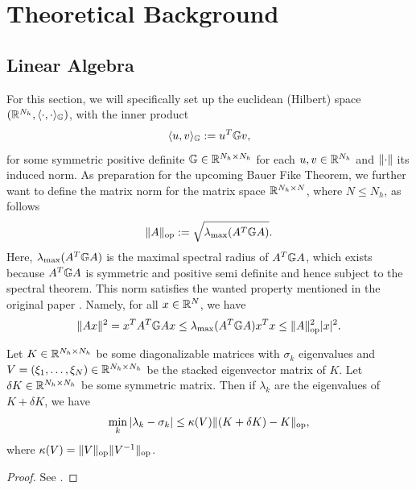 \chapter{Theoretical Background} \label{chapter: theoretical background}




\section{Linear Algebra} \label{section: linear algebra}


For this section, we will specifically set up the euclidean (Hilbert) space $(\mathbb{R}^{N_h}, \langle \cdot, \cdot \rangle_{\mathbb{G}})$,
with the inner product
\begin{equation*}
    \langle u, v \rangle_{\mathbb{G}} := u^T \mathbb{G} v,
\end{equation*}
for some symmetric positive definite $\mathbb{G} \in \mathbb{R}^{N_h \times N_h}$ for each $u, v \in \mathbb{R}^{N_h}$ and
$\lVert \cdot \rVert$ its induced norm. 
As preparation for the upcoming Bauer Fike Theorem, we further want to define the matrix norm for the 
matrix space $\mathbb{R}^{N_h \times N}$,
where $N \leq N_h$, as follows
\begin{equation*}
    \lVert A \rVert_\text{op} := \sqrt{\lambda_\text{max}(A^T \mathbb{G} A)}.
\end{equation*}
Here, $\lambda_\text{max}(A^T \mathbb{G} A)$ is the maximal spectral radius of $A^T \mathbb{G} A$, 
which exists because $A^T \mathbb{G} A$ is symmetric and positive semi definite
and hence subject to the spectral theorem.
This norm satisfies the wanted property mentioned in the original paper \cite[p. 137-141]{bauer1960la}. Namely, 
for all $x \in \mathbb{R}^{N}$, we have
\begin{equation*}
    \lVert Ax \rVert^2 = x^T A^T \mathbb{G} A x \leq \lambda_\text{max}(A^T \mathbb{G} A) x^T x \leq \lVert A \rVert_\text{op}^2 \lvert x \rvert^2.
\end{equation*} 

\begin{theorem} \label{theo: bauer fike}
    Let $K \in \mathbb{R}^{N_h \times N_h}$ be some diagonalizable matrices with $\sigma_k$ eigenvalues and 
    $V = (\xi_1, \dots, \xi_N) \in \mathbb{R}^{N_h \times N_h}$ be the stacked eigenvector matrix of $K$. Let 
    $\delta K \in \mathbb{R}^{N_h \times N_h}$ be some symmetric matrix. Then if $\lambda_{k}$ are the eigenvalues of 
    $K + \delta K$, we have 
    \begin{equation*}
        \min\limits_{k} \vert \lambda_k - \sigma_k \vert \leq \kappa(V) \lVert (K + \delta K) - K \rVert_\text{op},
    \end{equation*}
    where $\kappa(V) = \lVert V \rVert_\text{op} \lVert V^{-1} \rVert_\text{op}$.
\end{theorem}
\begin{proof}
    See \cite[p. 137-141]{bauer1960la}.
\end{proof}

